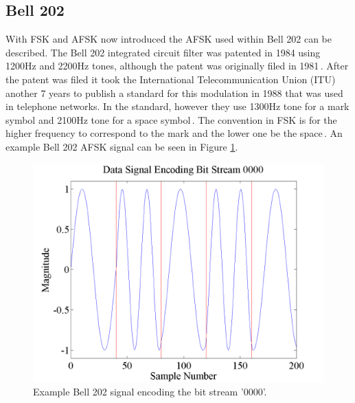\subsection{Bell 202}
With FSK and AFSK now introduced the AFSK used within Bell 202 can be described. The Bell 202 integrated circuit filter was patented in 1984 using 1200Hz and 2200Hz tones, although the patent was originally filed in 1981\,\cite{stauffer1984fsk}. After the patent was filed it took the International Telecommunication Union (ITU) another 7 years to publish a standard for this modulation in 1988 that was used in telephone networks. In the standard, however they use 1300Hz tone for a mark symbol and 2100Hz tone for a space symbol\,\cite{ITUV23}. The convention in FSK is for the higher frequency to correspond to the mark and the lower one be the space\,\cite{Watson1980}. An example Bell 202 AFSK signal can be seen in Figure \ref{exampleBitStream}.
\begin{figure}
  \centering
	\includegraphics[width=0.75\linewidth]{images/Datasignalencodingbitstream0000.png} 
	\caption{Example Bell 202 signal encoding the bit stream '0000'.}
	\label{exampleBitStream}
\end{figure}
